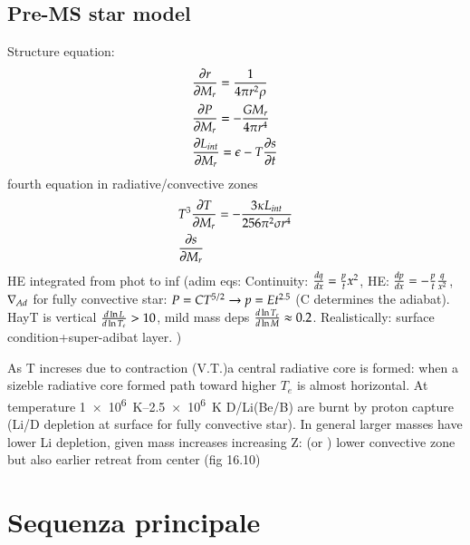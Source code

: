 \subsection{Pre-MS star model}
Structure equation:
\begin{align*}
&\PDy{M_r}{r}=\frac{1}{4\pi r^2\rho}\\
&\PDy{M_r}{P}=-\frac{GM_r}{4\pi r^4}\\
&\PDy{M_r}{L_{int}}=\epsilon-T\PDy{t}{s}
\end{align*}
fourth equation in radiative/convective zones
\begin{align*}
&T^3\PDy{M_r}{T}=-\frac{3\kappa L_{int}}{256\pi^2\sigma r^4}\\
&\PDy{M_r}{s}
\end{align*}
HE integrated from phot to inf
(adim eqs:
Continuity: $\TDy{x}{q}=\frac{p}{t}x^2$, HE: $\TDy{x}{p}=-\frac{p}{t}\frac{q}{x^2}$, $\nad$ for fully convective star: $P=CT\expy{5/2}\to p=Et\expy{2.5}$ (C determines the adiabat).
HayT is vertical $\TDly{T_e}{L}>10$, mild mass deps $\TDly{M}{T_e}\approx0.2$. Realistically: surface condition+super-adibat layer.
)

As T increses due to contraction (V.T.)a central radiative core is formed: when a sizeble radiative core formed path toward higher $T_e$ is almost horizontal.
At temperature \SIrange{1e6}{2.5e6}{\kelvin} D/Li(Be/B) are burnt by proton capture (Li/D depletion at surface for fully convective star).
In general larger masses have lower Li depletion, given mass increases increasing Z: (or ) lower convective zone but also earlier retreat from center (fig 16.10)


\section{Sequenza principale}

